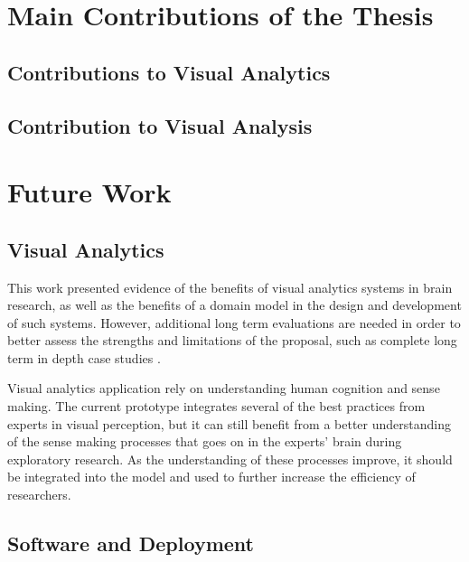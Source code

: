 \section{Main Contributions of the Thesis}

\subsection{Contributions to Visual Analytics}

\subsection{Contribution to Visual Analysis }


\section{Future Work}

\subsection{Visual Analytics}
This work presented evidence of the benefits of visual analytics systems in brain research, as well as the benefits of a domain model in the design and development of such systems. However, additional long term evaluations are needed in order to better assess the strengths and limitations of the proposal, such as complete long term in depth case studies \autocite{shneiderman_strategies_2006}. 

Visual analytics application rely on understanding human cognition and sense making. The current prototype integrates several of the best practices from experts in visual perception, but it can still benefit from a better understanding of the sense making processes that goes on in the experts' brain during exploratory research. As the understanding of these processes improve, it should be integrated into the model and used to further increase the efficiency of researchers.


\subsection{Software and Deployment}

